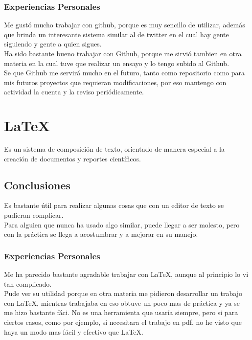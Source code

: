 \documentclass[10pt]{article}
\begin{document}
{{\begin{flushleft}
\subsubsection{Experiencias Personales}
Me gust\'o mucho trabajar con github, porque es muy sencillo de utilizar, adem\'as que brinda un interesante sistema similar al de twitter en el cual hay gente siguiendo y gente a quien sigues.\\
Ha sido bastante bueno trabajar con Github, porque me sirvi\'o tambien en otra materia en la cual tuve que realizar un ensayo y lo tengo subido al Github.\\\vspace{0.1in}
Se que Github me servir\'a mucho en el futuro, tanto como repositorio como para mis futuros proyectos que requieran modificaciones, por eso mantengo con actividad la cuenta y la reviso peri\'odicamente.


\newpage
\section{\LaTeX{}}
Es un sistema de composici\'on de texto, orientado de manera especial a la creaci\'on de documentos y reportes cient\'ificos.
\subsection{Conclusiones}
Es bastante \'util para realizar algunas cosas que con un editor de texto se pudieran complicar.\\
Para alguien que nunca ha usado algo similar, puede llegar a ser molesto, pero con la pr\'actica se llega a acostumbrar y a mejorar en su manejo.
\subsubsection{Experiencias Personales}
Me ha parecido bastante agradable trabajar con \LaTeX{}, aunque al principio lo vi tan complicado.\\
Pude ver su utilidad porque en otra materia me pidieron desarrollar un trabajo con \LaTeX{}, mientras trabajaba en eso obtuve un poco mas de pr\'actica y ya se me hizo bastante f\'aci. No es una herramienta que usar\'ia siempre, pero si para ciertos casos, como por ejemplo, si necesitara el trabajo en pdf, no he visto que haya un modo mas f\'acil y efectivo que \LaTeX{}.

\end{flushleft}

}}
\end{document}
